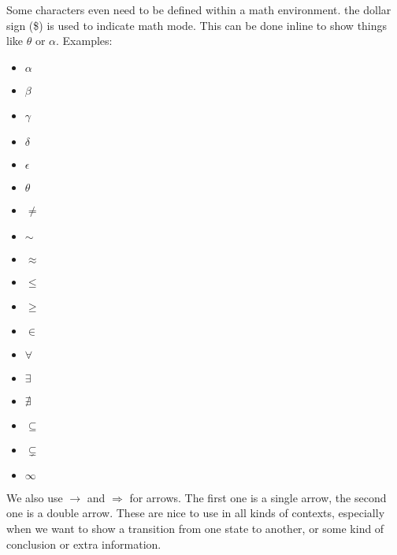 \begin{remark}
    Some characters even need to be defined within a math environment. the dollar sign (\$) is used to indicate math mode.
    This can be done inline to show things like $\theta$ or $\alpha$.
    Examples:

    \begin{minipage}{0.3\linewidth}
        \begin{itemize}
            \item $\alpha$
            \item $\beta$
            \item $\gamma$
            \item $\delta$
            \item $\epsilon$
            \item $\theta$
        \end{itemize}
    \end{minipage}
    \begin{minipage}{0.3\linewidth}
        \begin{itemize}
            \item $\neq$
            \item $\sim$
            \item $\approx$
            \item $\leq$
            \item $\geq$
            \item $\in$
        \end{itemize}
    \end{minipage}
    \begin{minipage}{0.3\linewidth}
        \begin{itemize}
            \item $\forall$
            \item $\exists$
            \item $\nexists$
            \item $\subseteq$
            \item $\subsetneq$
            \item $\infty$
        \end{itemize}
    \end{minipage}  

    We also use $\rightarrow$ and $\Rightarrow$ for arrows. The first one is a single arrow, the second one is a double arrow.
    These are nice to use in all kinds of contexts, especially when we want to show a transition from one state to another, or some kind of conclusion or extra information.
\end{remark}

